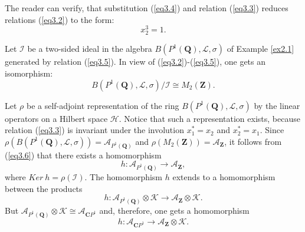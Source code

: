 \documentclass[10pt, reqno]{amsart}
\theoremstyle{definition}
\theoremstyle{remark}
\numberwithin{equation}{section}
\begin{document}
The reader can verify, that substitution (\ref{eq3.4}) and relation (\ref{eq3.3}) 
reduces relations (\ref{eq3.2}) to the form: 
\begin{equation}\label{eq3.5}
x_2^3=1.
\end{equation}

Let $\mathscr{I}$ be a two-sided ideal in the algebra $B(P^1(\mathbf{Q}), \mathcal{L}, \sigma)$ of 
Example \ref{ex2.1} generated by relation (\ref{eq3.5}).  In view of (\ref{eq3.2})-(\ref{eq3.5}), one gets an 
isomorphism: 
\begin{equation}\label{eq3.6}
B(P^1(\mathbf{Q}), \mathcal{L}, \sigma)/\mathscr{I}\cong M_2(\mathbf{Z}). 
\end{equation}

Let $\rho$ be a self-adjoint representation of the ring $B(P^1(\mathbf{Q}), \mathcal{L}, \sigma)$
by the linear operators on a Hilbert space $\mathscr{H}$. Notice that such a representation 
exists, because relation (\ref{eq3.3}) is invariant under the involution $x_1^*=x_2$ and 
$x_2^*=x_1$. Since $\rho(B(P^1(\mathbf{Q}), \mathcal{L}, \sigma))=\mathscr{A}_{P^1(\mathbf{Q})}$
and $\rho(M_2(\mathbf{Z}))=\mathscr{A}_{\mathbf{Z}}$, it follows from (\ref{eq3.6}) that there exists a homomorphism
\begin{equation}\label{eq3.7}
h:  \mathscr{A}_{P^1(\mathbf{Q})}\to\mathscr{A}_{\mathbf{Z}},
\end{equation}
where  $Ker ~h=\rho(\mathscr{I})$.  
The homomorphism $h$ extends to a homomorphism between the 
 products
\begin{equation}\label{eq3.8}
h:  \mathscr{A}_{P^1(\mathbf{Q})}\otimes\mathscr{K}\to\mathscr{A}_{\mathbf{Z}}\otimes\mathscr{K}. 
\end{equation}
But $\mathscr{A}_{P^1(\mathbf{Q})}\otimes\mathscr{K}\cong \mathscr{A}_{\mathbf{C}P^1}$
and, therefore, one gets a homomorphism
\begin{equation}\label{eq3.9}
h: \mathscr{A}_{\mathbf{C}P^1} \to\mathscr{A}_{\mathbf{Z}}\otimes\mathscr{K}. 
\end{equation}
\end{document}
